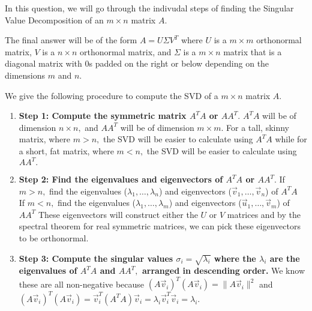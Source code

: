 

In this question, we will go through the indivudal steps of finding the Singular Value Decomposition of an $m \times n$ matrix $A.$

The final answer will be of the form $A = U \Sigma V^{T}$ where $U$ is a $m \times m$ orthonormal matrix, $V$ is a $n \times n$ orthonormal matrix, and $\Sigma$ is a $m \times n$ matrix that is a diagonal matrix with $0$s padded on the right or below depending on the dimensions $m$ and $n.$

We give the following procedure to compute the SVD of a $m \times n$ matrix $A.$

\begin{enumerate}[label=(\roman*)]
  \item \textbf{Step 1: Compute the symmetric matrix $A^{T} A$ or $A A^{T}.$} \vskip 1pt
  $A^{T}A$ will be of dimension $n \times n,$ and $AA^{T}$ will be of dimension $m \times m.$ \vskip 1pt
  For a tall, skinny matrix, where $m > n,$ the SVD will be easier to calculate using $A^{T}A$ while for a short, fat matrix, where $m < n,$ the SVD will be easier to calculate using $AA^{T}.$ 

  \item \textbf{Step 2: Find the eigenvalues and eigenvectors of $A^{T} A$ or $AA^{T}.$} \vskip 1pt
  If $m > n,$ find the eigenvalues ($\lambda_1, \ldots, \lambda_{n}$) and eigenvectors ($\vec{v}_1, \ldots, \vec{v}_{n}$) of $A^TA$ \\
  If $m < n,$ find the eigenvalues ($\lambda_1, \ldots, \lambda_{m}$) and eigenvectors ($\vec{u}_{1}, \ldots, \vec{v}_{m}$) of $AA^{T}$ \vskip 1pt
  These eigenvectors will construct either the $U$ or $V$ matrices and by the spectral theorem for real symmetric matrices, we can pick these eigenvectors to be orthonormal.

  \item \textbf{Step 3: Compute the singular values $\sigma_i = \sqrt{\lambda_i}$ where the $\lambda_i$ are the eigenvalues of $A^{T}A$ and $AA^{T},$ arranged in descending order.} \vskip 1pt 
  We know these are all non-negative because $(A\vec{v}_i)^T(A\vec{v}_i) = \|A \vec{v}_i\|^2$ and $(A\vec{v}_i)^T(A\vec{v}_i) =\vec{v}_i^T(A^T A)\vec{v}_i = \lambda_i \vec{v}_i^T\vec{v}_i = \lambda_i$. 


\end{enumerate}
